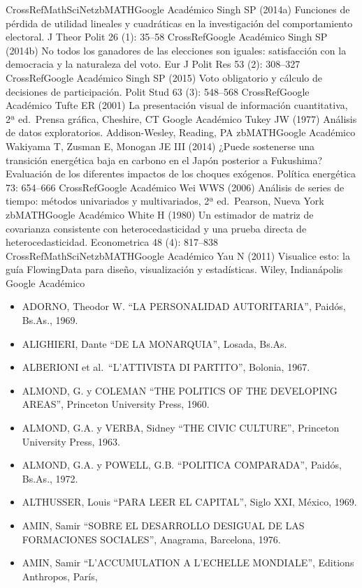 \documentclass[
]{book}
\providecommand{\tightlist}{%
  \setlength{\itemsep}{0pt}\setlength{\parskip}{0pt}}
\begin{document}
CrossRefMathSciNetzbMATHGoogle Académico
Singh SP (2014a) Funciones de pérdida de utilidad lineales y cuadráticas en la investigación del comportamiento electoral. J Theor Polit 26 (1): 35--58
CrossRefGoogle Académico
Singh SP (2014b) No todos los ganadores de las elecciones son iguales: satisfacción con la democracia y la naturaleza del voto. Eur J Polit Res 53 (2): 308--327
CrossRefGoogle Académico
Singh SP (2015) Voto obligatorio y cálculo de decisiones de participación. Polit Stud 63 (3): 548--568
CrossRefGoogle Académico
Tufte ER (2001) La presentación visual de información cuantitativa, 2ª ed.~Prensa gráfica, Cheshire, CT
Google Académico
Tukey JW (1977) Análisis de datos exploratorios. Addison-Wesley, Reading, PA
zbMATHGoogle Académico
Wakiyama T, Zusman E, Monogan JE III (2014) ¿Puede sostenerse una transición energética baja en carbono en el Japón posterior a Fukushima? Evaluación de los diferentes impactos de los choques exógenos. Política energética 73: 654--666
CrossRefGoogle Académico
Wei WWS (2006) Análisis de series de tiempo: métodos univariados y multivariados, 2ª ed.~Pearson, Nueva York
zbMATHGoogle Académico
White H (1980) Un estimador de matriz de covarianza consistente con heterocedasticidad y una prueba directa de heterocedasticidad. Econometrica 48 (4): 817--838
CrossRefMathSciNetzbMATHGoogle Académico
Yau N (2011) Visualice esto: la guía FlowingData para diseño, visualización y estadísticas. Wiley, Indianápolis
Google Académico

\begin{itemize}
\tightlist
\item
  ADORNO, Theodor W. ``LA PERSONALIDAD AUTORITARIA'', Paidós, Bs.As., 1969.
\item
  ALIGHIERI, Dante ``DE LA MONARQUIA'', Losada, Bs.As.
\item
  ALBERIONI et al.~``L'ATTIVISTA DI PARTITO'', Bolonia, 1967.
\item
  ALMOND, G. y COLEMAN ``THE POLITICS OF THE DEVELOPING AREAS'', Princeton
  University Press, 1960.
\item
  ALMOND, G.A. y VERBA, Sidney ``THE CIVIC CULTURE'', Princeton University Press, 1963.
\item
  ALMOND, G.A. y POWELL, G.B. ``POLITICA COMPARADA'', Paidós, Bs.As., 1972.
\item
  ALTHUSSER, Louis ``PARA LEER EL CAPITAL'', Siglo XXI, México, 1969.
\item
  AMIN, Samir ``SOBRE EL DESARROLLO DESIGUAL DE LAS FORMACIONES SOCIALES'',
  Anagrama, Barcelona, 1976.
\item
  AMIN, Samir ``L'ACCUMULATION A L'ECHELLE MONDIALE'', Editions Anthropos, París,
\end{itemize}
\end{document}

